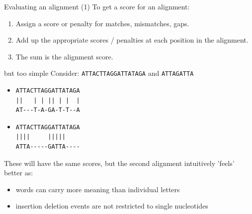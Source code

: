\documentclass[pdf]{beamer}
\newcommand\blfootnote[1]{%
  \begingroup  %
  \renewcommand\thefootnote{}\footnote{#1}%
  \addtocounter{footnote}{-1}  %
  \endgroup
}
\begin{document}
\begin{frame}{Evaluating an alignment (1)}
  To get a score for an alignment:
  \begin{enumerate}
  \item Assign a score or penalty for matches, mismatches, gaps.
  \item Add up the appropriate scores / penalties at each position in the
    alignment.
  \item The sum is the alignment score.
  \end{enumerate}
\end{frame}


\begin{frame}[fragile]{but too simple}
  Consider: \verb|ATTACTTAGGATTATAGA| and \verb|ATTAGATTA|
  \pause
  \begin{itemize}
  \item 
\begin{verbatim}
ATTACTTAGGATTATAGA
||   | | || | |  |
AT---T-A-GA-T-T--A
\end{verbatim} \pause
  \item
\begin{verbatim}
ATTACTTAGGATTATAGA
||||     |||||
ATTA-----GATTA----
\end{verbatim}
\end{itemize}
These will have the same scores, but the second alignment intuitively 'feels' better as:
\begin{itemize}
\item words can carry more meaning than individual letters
\item insertion deletion events are not restricted to single nucleotides
\end{itemize}
\end{frame}
\end{document}

